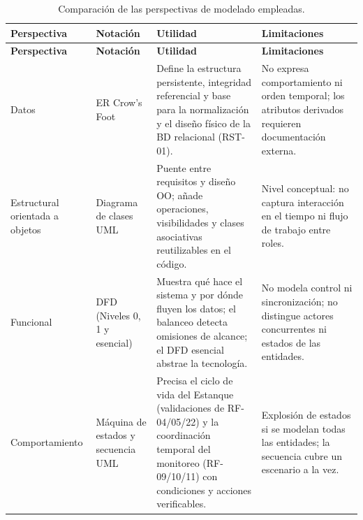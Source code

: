 \documentclass[11pt,a4paper]{article}
\renewcommand{\_}{\textunderscore\allowbreak}
\begin{document}
\begin{longtable}{|p{2.8cm}|p{2.9cm}|p{4.0cm}|p{3.9cm}|}
\caption{Comparación de las perspectivas de modelado empleadas.}
\label{tab:comparativa}\\
\hline
\textbf{Perspectiva} & \textbf{Notación} & \textbf{Utilidad} & \textbf{Limitaciones}\\
\hline
\endfirsthead

\hline
\textbf{Perspectiva} & \textbf{Notación} & \textbf{Utilidad} & \textbf{Limitaciones}\\
\hline
\endhead

\hline
\endfoot

\hline
\endlastfoot

Datos & ER Crow's Foot & Define la estructura persistente, integridad referencial y base para la normalización y el diseño físico de la BD relacional (RST-01). & No expresa comportamiento ni orden temporal; los atributos derivados requieren documentación externa.\\
\hline
Estructural orientada a objetos & Diagrama de clases UML & Puente entre requisitos y diseño OO; añade operaciones, visibilidades y clases asociativas reutilizables en el código. & Nivel conceptual: no captura interacción en el tiempo ni flujo de trabajo entre roles.\\
\hline
Funcional & DFD (Niveles 0, 1 y esencial) & Muestra qué hace el sistema y por dónde fluyen los datos; el balanceo detecta omisiones de alcance; el DFD esencial abstrae la tecnología. & No modela control ni sincronización; no distingue actores concurrentes ni estados de las entidades.\\
\hline
Comportamiento & Máquina de estados y secuencia UML & Precisa el ciclo de vida del Estanque (validaciones de RF-04/05/22) y la coordinación temporal del monitoreo (RF-09/10/11) con condiciones y acciones verificables. & Explosión de estados si se modelan todas las entidades; la secuencia cubre un escenario a la vez.\\

\end{longtable}

\end{document}
